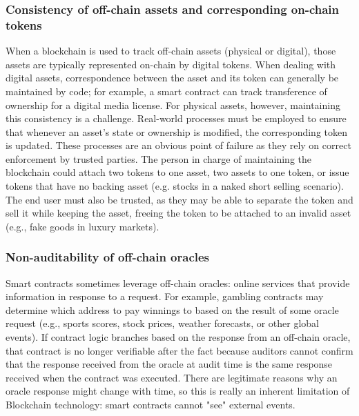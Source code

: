 \subsubsection{Consistency of off-chain assets and corresponding on-chain tokens}
When a blockchain is used to track off-chain assets (physical or digital), those assets are typically represented on-chain by digital tokens. When dealing with digital assets, correspondence between the asset and its token can generally be maintained by code; for example, a smart contract can track transference of ownership for a digital media license. For physical assets, however, maintaining this consistency is a challenge. Real-world processes must be employed to ensure that whenever an asset's state or ownership is modified, the corresponding token is updated. These processes are an obvious point of failure as they rely on correct enforcement by trusted parties. The person in charge of maintaining the blockchain could attach two tokens to one asset, two assets to one token, or issue tokens that have no backing asset (e.g. stocks in a naked short selling scenario). The end user must also be trusted, as they may be able to separate the token and sell it while keeping the asset, freeing the token to be attached to an invalid asset (e.g., fake goods in luxury markets). 




\subsubsection{Non-auditability of off-chain oracles}
Smart contracts sometimes leverage off-chain oracles: online services that provide information in response to a request. For example, gambling contracts may determine which address to pay winnings to based on the result of some oracle request (e.g., sports scores, stock prices, weather forecasts, or other global events). If contract logic branches based on the response from an off-chain oracle, that contract is no longer verifiable after the fact because auditors cannot confirm that the response received from the oracle at audit time is the same response received when the contract was executed. There are legitimate reasons why an oracle response might change with time, so this is really an inherent limitation of Blockchain technology: smart contracts cannot "see" external events.

